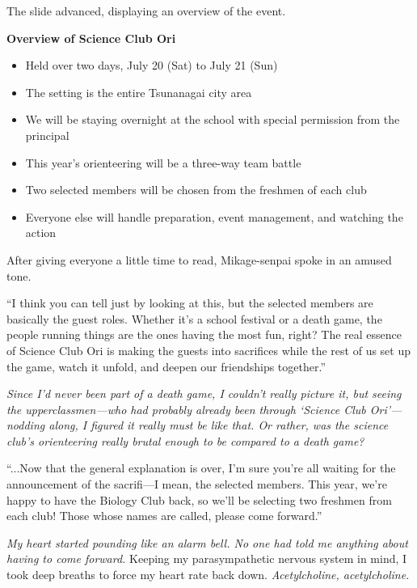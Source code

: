 \documentclass[
    a4paper,
    12pt,
    twoside,
    openany,
    UTF8,
    fontset=windows
]{ctexbook}
\begin{document}
The slide advanced, displaying an overview of the event.

\begin{center}
\textbf{Overview of Science Club Ori}
\end{center}

\begin{itemize}
\item Held over two days, July 20 (Sat) to July 21 (Sun)
\item The setting is the entire Tsunanagai city area
\item We will be staying overnight at the school with special permission from the principal
\item This year's orienteering will be a three-way team battle
\item Two selected members will be chosen from the freshmen of each club
\item Everyone else will handle preparation, event management, and watching the action
\end{itemize}

After giving everyone a little time to read, Mikage-senpai spoke in an amused tone.

``I think you can tell just by looking at this, but the selected members are basically the guest roles. Whether it's a school festival or a death game, the people running things are the ones having the most fun, right? The real essence of Science Club Ori is making the guests into sacrifices while the rest of us set up the game, watch it unfold, and deepen our friendships together.''

\textit{Since I'd never been part of a death game, I couldn't really picture it, but seeing the upperclassmen---who had probably already been through `Science Club Ori'---nodding along, I figured it really must be like that. Or rather, was the science club's orienteering really brutal enough to be compared to a death game?}

``...Now that the general explanation is over, I'm sure you're all waiting for the announcement of the sacrifi---I mean, the selected members. This year, we're happy to have the Biology Club back, so we'll be selecting two freshmen from each club! Those whose names are called, please come forward.''

\textit{My heart started pounding like an alarm bell. No one had told me anything about having to come forward.} Keeping my parasympathetic nervous system in mind, I took deep breaths to force my heart rate back down. \textit{Acetylcholine, acetylcholine.}
\end{document}
